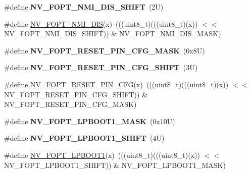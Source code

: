 \begin{DoxyCompactItemize}
\item 
\mbox{\label{group___n_v___register___masks_ga8a4632e08257c81a80d8be3cdac911f9}} 
\#define {\bfseries N\+V\+\_\+\+F\+O\+P\+T\+\_\+\+N\+M\+I\+\_\+\+D\+I\+S\+\_\+\+S\+H\+I\+FT}~(2\+U)
\item 
\#define \mbox{\hyperlink{group___n_v___register___masks_ga65c16570531fad557aa2931e31014d41}{N\+V\+\_\+\+F\+O\+P\+T\+\_\+\+N\+M\+I\+\_\+\+D\+IS}}(x)~(((uint8\+\_\+t)(((uint8\+\_\+t)(x)) $<$$<$ N\+V\+\_\+\+F\+O\+P\+T\+\_\+\+N\+M\+I\+\_\+\+D\+I\+S\+\_\+\+S\+H\+I\+FT)) \& N\+V\+\_\+\+F\+O\+P\+T\+\_\+\+N\+M\+I\+\_\+\+D\+I\+S\+\_\+\+M\+A\+SK)
\item 
\mbox{\label{group___n_v___register___masks_ga4b475b316319ff2d76d026ca0a9df50a}} 
\#define {\bfseries N\+V\+\_\+\+F\+O\+P\+T\+\_\+\+R\+E\+S\+E\+T\+\_\+\+P\+I\+N\+\_\+\+C\+F\+G\+\_\+\+M\+A\+SK}~(0x8\+U)
\item 
\mbox{\label{group___n_v___register___masks_ga9ea43f031c7695bdbf13c5168dabee6d}} 
\#define {\bfseries N\+V\+\_\+\+F\+O\+P\+T\+\_\+\+R\+E\+S\+E\+T\+\_\+\+P\+I\+N\+\_\+\+C\+F\+G\+\_\+\+S\+H\+I\+FT}~(3\+U)
\item 
\#define \mbox{\hyperlink{group___n_v___register___masks_ga2284a16380d7f994428c71ffe7adbd7f}{N\+V\+\_\+\+F\+O\+P\+T\+\_\+\+R\+E\+S\+E\+T\+\_\+\+P\+I\+N\+\_\+\+C\+FG}}(x)~(((uint8\+\_\+t)(((uint8\+\_\+t)(x)) $<$$<$ N\+V\+\_\+\+F\+O\+P\+T\+\_\+\+R\+E\+S\+E\+T\+\_\+\+P\+I\+N\+\_\+\+C\+F\+G\+\_\+\+S\+H\+I\+FT)) \& N\+V\+\_\+\+F\+O\+P\+T\+\_\+\+R\+E\+S\+E\+T\+\_\+\+P\+I\+N\+\_\+\+C\+F\+G\+\_\+\+M\+A\+SK)
\item 
\mbox{\label{group___n_v___register___masks_ga0152e105ece0b627e9d8ffea2ec30cd9}} 
\#define {\bfseries N\+V\+\_\+\+F\+O\+P\+T\+\_\+\+L\+P\+B\+O\+O\+T1\+\_\+\+M\+A\+SK}~(0x10\+U)
\item 
\mbox{\label{group___n_v___register___masks_ga5acee776b6df2ef3408eb72e2caed133}} 
\#define {\bfseries N\+V\+\_\+\+F\+O\+P\+T\+\_\+\+L\+P\+B\+O\+O\+T1\+\_\+\+S\+H\+I\+FT}~(4\+U)
\item 
\#define \mbox{\hyperlink{group___n_v___register___masks_ga4f966d3cc3b2192e84f3b5339794dd2b}{N\+V\+\_\+\+F\+O\+P\+T\+\_\+\+L\+P\+B\+O\+O\+T1}}(x)~(((uint8\+\_\+t)(((uint8\+\_\+t)(x)) $<$$<$ N\+V\+\_\+\+F\+O\+P\+T\+\_\+\+L\+P\+B\+O\+O\+T1\+\_\+\+S\+H\+I\+FT)) \& N\+V\+\_\+\+F\+O\+P\+T\+\_\+\+L\+P\+B\+O\+O\+T1\+\_\+\+M\+A\+SK)
$$
\end{DoxyCompactItemize}
